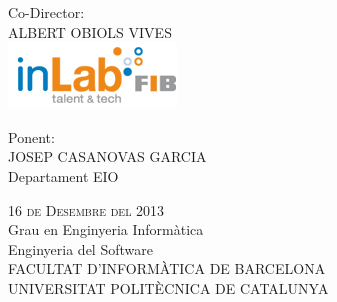 \begin{titlepage}
\begin{center}
\begin{minipage}{0.30\textwidth}
\begin{flushleft}
        \end{flushleft}
    \end{minipage}
    \begin{minipage}{0.30\textwidth}
        \begin{flushleft}
            Co-Director:                                                \\[0.6\baselineskip]
            ALBERT OBIOLS VIVES                                         \\[0.6\baselineskip]
            \includegraphics[scale=0.4]{NotDef/logo_inlab.png}          \\
        \end{flushleft}
    \end{minipage}
    \begin{minipage}{0.30\textwidth}
        \begin{flushleft} 
            Ponent:                                                     \\[1\baselineskip]
            JOSEP CASANOVAS GARCIA                                      \\[1\baselineskip]
            \small{Departament EIO}                                     \\[0.7\baselineskip]
        \end{flushleft}
    \end{minipage}
    \vfill
    {\huge\scshape 16 de Desembre del 2013}                                     \\[2.0\baselineskip]
    {\large Grau en Enginyeria Informàtica}                             \\[0.3\baselineskip]
    {\large Enginyeria del Software}                                    \\[1.5\baselineskip]
    {\large FACULTAT D'INFORMÀTICA DE BARCELONA}                        \\[0.3\baselineskip]
    {\large UNIVERSITAT POLITÈCNICA DE CATALUNYA}
\end{center}
\end{titlepage}

    
\newpage
\mbox{}
\thispagestyle{empty} %


